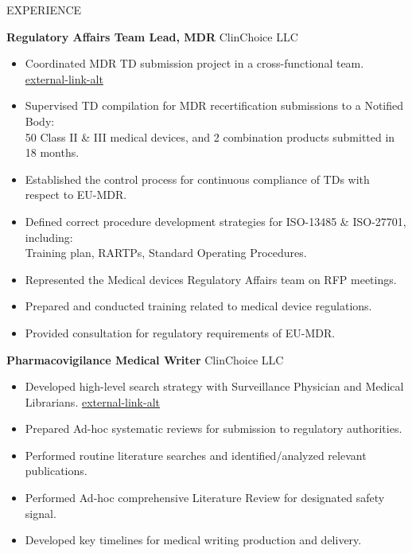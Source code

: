 \documentclass{resume}
\begin{document}
\begin{rSection}{EXPERIENCE}
\vspace{-1em}
\item \textbf{Regulatory Affairs Team Lead, MDR} \hfill {ClinChoice LLC}
\begin{itemize}
    \itemsep -2.22pt {}
    \item Coordinated MDR TD submission project in a cross-functional team. \hfill {\tiny{\href{https://clinchoice.com/solutions/medical-device-regulatory-affairs/technical-document-submission-approval-preparation}{\faIcon
{external-link-alt}}}}
    \item Supervised TD compilation for MDR recertification submissions to a Notified Body:\\
         50 Class II \& III medical devices, and 2 combination products submitted in 18 months.
    \item Established the control process for continuous compliance of TDs with respect to EU-MDR.
    \item Defined correct procedure development strategies for ISO-13485 \& ISO-27701, including:\\
          Training plan, RARTPs, Standard Operating Procedures.
    \item Represented the Medical devices Regulatory Affairs team on RFP meetings.
    \item Prepared and conducted training related to medical device regulations.
    \item Provided consultation for regulatory requirements of EU-MDR.
 \end{itemize}

\item \textbf{Pharmacovigilance Medical Writer} \hfill {ClinChoice LLC}
\begin{itemize}
    \itemsep -2.22pt {}
    \item Developed high-level search strategy with Surveillance Physician and Medical Librarians. \hfill {\tiny {\href{https://clinchoice.com/solutions/medical-device-safety/literature-monitoring/}{\faIcon
{external-link-alt}}}}
    \item Prepared Ad-hoc systematic reviews for submission to regulatory authorities.
    \item Performed routine literature searches and identified/analyzed relevant publications.
    \item Performed Ad-hoc comprehensive Literature Review for designated safety signal.
    \item Developed key timelines for medical writing production and delivery.\newpage
 \end{itemize}


\end{rSection}
\end{document}
